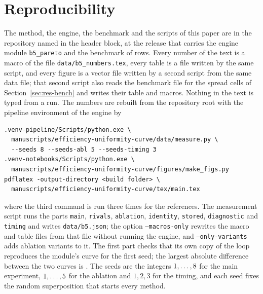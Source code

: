 \section{Reproducibility}\label{sec:repro}

The method, the engine, the benchmark and the scripts of this paper are in the repository named in the header block, at the release that carries the engine module \texttt{b5\_pareto} and the benchmark of \benchRows{} rows. Every number of the text is a macro of the file \texttt{data/b5\_numbers.tex}, every table is a file written by the same script, and every figure is a vector file written by a second script from the same data file; that second script also reads the benchmark file for the spread cells of Section~\ref{sec:res-bench} and writes their table and macros. Nothing in the text is typed from a run.
The numbers are rebuilt from the repository root with the pipeline environment of the engine by
\begin{verbatim}
.venv-pipeline/Scripts/python.exe \
  manuscripts/efficiency-uniformity-curve/data/measure.py \
  --seeds 8 --seeds-abl 5 --seeds-timing 3
.venv-notebooks/Scripts/python.exe \
  manuscripts/efficiency-uniformity-curve/figures/make_figs.py
pdflatex -output-directory <build folder> \
  manuscripts/efficiency-uniformity-curve/tex/main.tex
\end{verbatim}
where the third command is run three times for the references. The measurement script runs the parts \texttt{main}, \texttt{rivals}, \texttt{ablation}, \texttt{identity}, \texttt{stored}, \texttt{diagnostic} and \texttt{timing} and writes \texttt{data/b5.json}; the option \texttt{--macros-only} rewrites the macro and table files from that file without running the engine, and \texttt{--only-variants} adds ablation variants to it.
The first part checks that its own copy of the loop reproduces the module's curve for the first seed; the largest absolute difference between the two curves is \consistMax{}. The seeds are the integers $1,\dots,8$ for the main experiment, $1,\dots,5$ for the ablation and $1,2,3$ for the timing, and each seed fixes the random superposition that starts every method.

